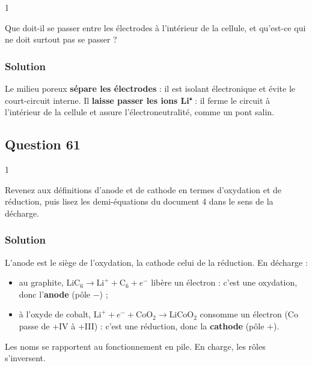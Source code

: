 \documentclass[11pt,a4paper]{article}
\providecommand{\tightlist}{\setlength{\itemsep}{0pt}\setlength{\parskip}{0pt}}
\begin{document}
\begin{indication}{1}

Que doit-il se passer entre les électrodes à l'intérieur de la cellule, et qu'est-ce qui ne doit surtout pas se passer ?

\end{indication}

\hypertarget{solution-59}{%
\subsubsection{Solution}\label{solution-59}}

Le milieu poreux \textbf{sépare les électrodes} : il est isolant électronique et évite le court-circuit interne. Il \textbf{laisse passer les ions Li⁺} : il ferme le circuit à l'intérieur de la cellule et assure l'électroneutralité, comme un pont salin.

\hypertarget{question-61}{%
\subsection{Question 61}\label{question-61}}

\begin{indication}{1}

Revenez aux définitions d'anode et de cathode en termes d'oxydation et de réduction, puis lisez les demi-équations du document 4 dans le sens de la décharge.

\end{indication}

\hypertarget{solution-60}{%
\subsubsection{Solution}\label{solution-60}}

L'anode est le siège de l'oxydation, la cathode celui de la réduction. En décharge :

\begin{itemize}
\tightlist
\item
  au graphite, \(\text{LiC}_6\to\text{Li}^++\text{C}_6+e^-\) libère un électron : c'est une oxydation, donc l'\textbf{anode} (pôle \(-\)) ;
\item
  à l'oxyde de cobalt, \(\text{Li}^++e^-+\text{CoO}_2\to\text{LiCoO}_2\) consomme un électron (Co passe de +IV à +III) : c'est une réduction, donc la \textbf{cathode} (pôle \(+\)).
\end{itemize}

Les noms se rapportent au fonctionnement en pile. En charge, les rôles s'inversent.
\end{document}
